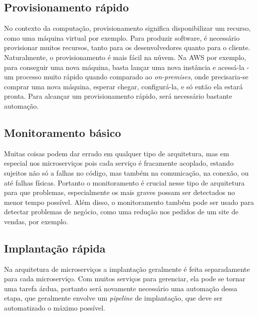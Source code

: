 
\subsection{Provisionamento rápido}

No contexto da computação, provisionamento significa disponibilizar um recurso, como uma máquina virtual por exemplo. Para produzir software, é necessário provisionar muitos recursos, tanto para os desenvolvedores quanto para o cliente. Naturalmente, o provisionamento é mais fácil na núvem. Na AWS por exemplo, para conseguir uma nova máquina, basta lançar uma nova instância e acessá-la - um processo muito rápido quando comparado ao \emph{on-premises}, onde precisaria-se comprar uma nova máquina, esperar chegar, configurá-la, e só então ela estará pronta. Para alcançar um provisionamento rápido, será necessário bastante automação. \cite{MartinFowlerMicroservicesPrereq}

\subsection{Monitoramento básico}

Muitas coisas podem dar errado em qualquer tipo de arquitetura, mas em especial nos microserviços pois cada serviço é fracamente acoplado, estando sujeitos não só a falhas no código, mas também na comunicação, na conexão, ou até falhas físicas. Portanto o monitoramento é crucial nesse tipo de arquitetura para que problemas, especialmente os mais graves possam ser detectados no menor tempo possível. Além disso, o monitoramento também pode ser usado para detectar problemas de negócio, como uma redução nos pedidos de um site de vendas, por exemplo. \cite{MartinFowlerMicroservicesPrereq}

\subsection{Implantação rápida}

Na arquitetura de microserviços a implantação geralmente é feita separadamente para cada microserviço. Com muitos serviços para gerenciar, ela pode se tornar uma tarefa árdua, portanto será novamente necessário uma automação dessa etapa, que geralmente envolve um \emph{pipeline} de implantação, que deve ser automatizado o máximo possível. \cite{MartinFowlerMicroservicesPrereq}

